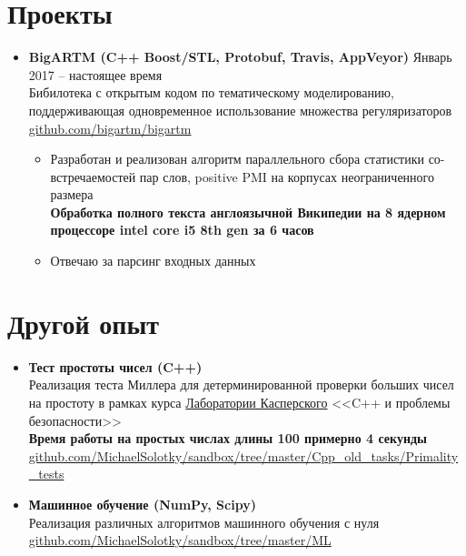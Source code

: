 \documentclass[letterpaper,11pt]{article}
\newcommand{\resumeSubHeadingListStart}{\begin{itemize}[leftmargin=*]}
\newcommand{\resumeSubHeadingListEnd}{\end{itemize}}
\begin{document}
\section{Проекты}
\resumeSubHeadingListStart
    \item{
      \textbf{{BigARTM}{ (C++ Boost/STL, Protobuf, Travis, AppVeyor)}}
      \hfill
      Январь 2017 -- настоящее время
    } \\
    Бибилотека с открытым кодом по тематическому моделированию, поддерживающая одновременное использование множества регуляризаторов \\
    \faGithub \enspace \href{https://github.com/bigartm/bigartm}{\color{blue} github.com/bigartm/bigartm}
    \begin{itemize}
      \item Разработан и реализован алгоритм параллельного сбора статистики со-встречаемостей пар слов, positive PMI на корпусах неограниченного размера \\
      \textbf{Обработка полного текста англоязычной Википедии на 8 ядерном процессоре intel core i5 8th gen за 6 часов}
      \item Отвечаю за парсинг входных данных
    \end{itemize}

  \resumeSubHeadingListEnd


\section{Другой опыт}
  \resumeSubHeadingListStart
      \item{
        \textbf{{Тест простоты чисел}{ (C++) }} \\
        Реализация теста Миллера для детерминированной проверки больших чисел на простоту в рамках курса \href{https://www.kaspersky.com/}{\color{blue} Лаборатории Касперского} <<C++ и проблемы безопасности>> \\
        \textbf{Время работы на простых числах длины 100 примерно 4 секунды} \\
        \faGithub \enspace \href{https://github.com/MichaelSolotky/sandbox/tree/master/Cpp_old_tasks/Primality_tests}{\color{blue} github.com/MichaelSolotky/sandbox/tree/master/Cpp\_old\_tasks/Primality\_tests}
      }

      \item{
        \textbf{Машинное обучение (NumPy, Scipy)} \\
        Реализация различных алгоритмов машинного обучения с нуля \\
        \faGithub \enspace \href{https://github.com/MichaelSolotky/sandbox/tree/master/ML}{\color{blue} github.com/MichaelSolotky/sandbox/tree/master/ML}
      }
      \resumeSubHeadingListEnd
\end{document}
